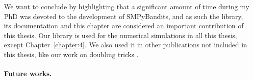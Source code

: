 We want to conclude by highlighting that a significant amount of time during my PhD was devoted to the development of SMPyBandits, and as such the library, its documentation and this chapter  are considered an important contribution of this thesis.
%
Our library is used for the numerical simulations in all this thesis, except Chapter~\ref{chapter:4}.
We also used it in other publications not included in this thesis, like our work on doubling tricks \cite{Besson2018DoublingTricks}.


\paragraph{Future works.}
%



